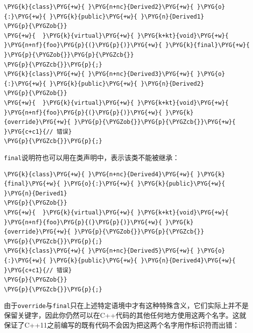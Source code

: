 
\begin{codeblockbg}
\begin{Verbatim}[commandchars=\\\{\},breaklines=true,breakanywhere=true,fontsize=\codefont,xleftmargin=17bp]
\PYG{k}{class}\PYG{+w}{ }\PYG{n+nc}{Derived2}\PYG{+w}{ }\PYG{o}{:}\PYG{+w}{ }\PYG{k}{public}\PYG{+w}{ }\PYG{n}{Derived1}
\PYG{p}{\PYGZob{}}
\PYG{+w}{  }\PYG{k}{virtual}\PYG{+w}{ }\PYG{k+kt}{void}\PYG{+w}{ }\PYG{n+nf}{foo}\PYG{p}{(}\PYG{p}{)}\PYG{+w}{ }\PYG{k}{final}\PYG{+w}{ }\PYG{p}{\PYGZob{}}\PYG{p}{\PYGZcb{}}
\PYG{p}{\PYGZcb{}}\PYG{p}{;}
\PYG{k}{class}\PYG{+w}{ }\PYG{n+nc}{Derived3}\PYG{+w}{ }\PYG{o}{:}\PYG{+w}{ }\PYG{k}{public}\PYG{+w}{ }\PYG{n}{Derived2}
\PYG{p}{\PYGZob{}}
\PYG{+w}{  }\PYG{k}{virtual}\PYG{+w}{ }\PYG{k+kt}{void}\PYG{+w}{ }\PYG{n+nf}{foo}\PYG{p}{(}\PYG{p}{)}\PYG{+w}{ }\PYG{k}{override}\PYG{+w}{ }\PYG{p}{\PYGZob{}}\PYG{p}{\PYGZcb{}}\PYG{+w}{ }\PYG{c+c1}{// 错误}
\PYG{p}{\PYGZcb{}}\PYG{p}{;}
\end{Verbatim}
\end{codeblockbg}



\texttt{final}说明符也可以用在类声明中，表示该类不能被继承：



\begin{codeblockbg}
\begin{Verbatim}[commandchars=\\\{\},breaklines=true,breakanywhere=true,fontsize=\codefont,xleftmargin=17bp]
\PYG{k}{class}\PYG{+w}{ }\PYG{n+nc}{Derived4}\PYG{+w}{ }\PYG{k}{final}\PYG{+w}{ }\PYG{o}{:}\PYG{+w}{ }\PYG{k}{public}\PYG{+w}{ }\PYG{n}{Derived1}
\PYG{p}{\PYGZob{}}
\PYG{+w}{  }\PYG{k}{virtual}\PYG{+w}{ }\PYG{k+kt}{void}\PYG{+w}{ }\PYG{n+nf}{foo}\PYG{p}{(}\PYG{p}{)}\PYG{+w}{ }\PYG{k}{override}\PYG{+w}{ }\PYG{p}{\PYGZob{}}\PYG{p}{\PYGZcb{}}
\PYG{p}{\PYGZcb{}}\PYG{p}{;}
\PYG{k}{class}\PYG{+w}{ }\PYG{n+nc}{Derived5}\PYG{+w}{ }\PYG{o}{:}\PYG{+w}{ }\PYG{k}{public}\PYG{+w}{ }\PYG{n}{Derived4}\PYG{+w}{ }\PYG{c+c1}{// 错误}
\PYG{p}{\PYGZob{}}
\PYG{p}{\PYGZcb{}}\PYG{p}{;}
\end{Verbatim}
\end{codeblockbg}



由于\texttt{override}与\texttt{final}只在上述特定语境中才有这种特殊含义，它们实际上并不是保留关键字，因此你仍然可以在C++代码的其他任何地方使用这两个名字。这就保证了C++11之前编写的既有代码不会因为把这两个名字用作标识符而出错：


